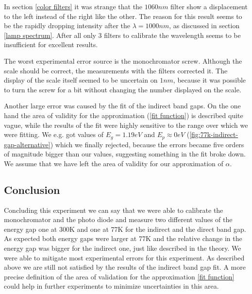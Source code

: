 \documentclass[]{article}
\begin{document}
In section \ref{color filters} it was strange that the $1060nm$ filter show a displacement to the left instead of the right like the other. The reason for this result seems to be the rapidly dropping intensity after the $\lambda =1000nm$, as discussed in section \ref{lamp spectrum}. After all only 3 filters to calibrate the wavelength seems to be insufficient for excellent results.

The worst experimental error source is the monochromator screw. Although the scale should be correct, the measurements with the filters corrected it. The display of the scale itself seemed to be uncertain on $1nm$, because it was possible to turn the screw for a bit without changing the number displayed on the scale. 

Another large error was caused by the fit of the indirect band gaps. On the one hand the area of validity for the approximation (\ref{fit function}) is described quite vague, while the results of the fit were highly sensitive to the range over which we were fitting. We e.g. got values of $E_g=1.19eV$ and $E_p\approx0eV$ (\ref{fig:77k-indirect-gap-alternative}) which we finally rejected, because the errors became five orders of magnitude bigger than our values, suggesting something in the fit broke down. We assume that we have left the area of validity for our approximation of $\alpha$. 

\subsection{Conclusion}
Concluding this experiment we can say that we were able to calibrate the monochromator and the photo diode and measure two different values of the energy gap one at 300K and one at 77K for the indirect and the direct band gap. As expected both energy gaps were larger at 77K and the relative change in the energy gap was bigger for the indirect one, just like described in the theory. We were able to mitigate most experimental errors for this experiment. As described above we are still not satisfied by the results of the indirect band gap fit. A more precise definition of the area of validation for the approximation \ref{fit function} could help in further experiments to minimize uncertainties in this area.

\newpage
\end{document}
